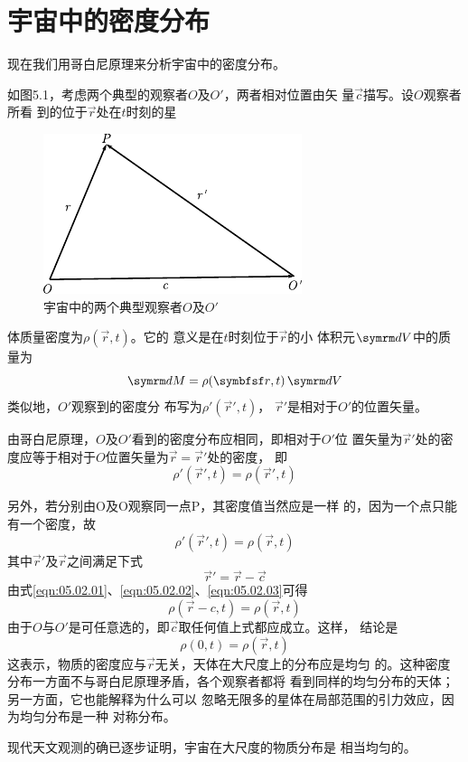 \section{宇宙中的密度分布}\label{sec:05.02}

现在我们用哥白尼原理来分析宇宙中的密度分布。

如图5.1，考虑两个典型的观察者$ O $及$  O'   $，两者相对位置由矢
量$ \vec{c} $描写。设$ O $观察者所看
到的位于$ \vec{r} $处在$ t $时刻的星
\begin{figure}
    \centering
    \includegraphics{figure/fig05.01}
    \caption{宇宙中的两个典型观察者$ O $及$ O' $}
    \label{fig:05.01}
\end{figure}
体质量密度为$  \rho ( \vec{r} , t )   $。它的
意义是在$ t $时刻位于$ \vec{r} $的小
体积元$ \dif V $中的质量为
{\setlength\mathindent{2em}
\begin{equation*}
    \dif M = \rho ( \vec{r} , t ) \dif V
\end{equation*}}
类似地，$ O' $观察到的密度分
布写为$  \rho ' ( \vec{r} ' , t )   $， $ \vec{r} ' $是相对于$ O' $的位置矢量。

由哥白尼原理，$ O $及$ O' $看到的密度分布应相同，即相对于$ O' $位
置矢量为$ \vec{r} ' $处的密度应等于相对于$ O $位置矢量为$ \vec{r} = \vec{r} ' $处的密度，
即
\begin{equation}\label{eqn:05.02.01}
    \rho ' ( \vec{r} ' , t ) = \rho ( \vec{r} ' , t )
\end{equation}

另外，若分别由O及O观察同一点P，其密度值当然应是一样
的，因为一个点只能有一个密度，故
\begin{equation}\label{eqn:05.02.02}
    \rho ' ( \vec{r} ' , t ) = \rho ( \vec{r} , t )
\end{equation}
其中$ \vec{r} ' $及$ \vec{r} $之间满足下式
\begin{equation}\label{eqn:05.02.03}
    \vec{r} ' = \vec{r} - \vec{c}
\end{equation}
由式\eqref{eqn:05.02.01}、\eqref{eqn:05.02.02}、\eqref{eqn:05.02.03}可得
\begin{equation}\label{eqn:05.02.04}
    \rho ( \vec{r} - c , t ) = \rho ( \vec{r} , t )
\end{equation}
由于$ O $与$ O' $是可任意选的，即$ \vec{c} $取任何值上式都应成立。这样，
结论是\vspace{-1.2em}
\begin{equation}\label{eqn:05.02.05}
    \rho ( 0 , t ) = \rho ( \vec{r} , t )
\end{equation}
这表示，物质的密度应与$ \vec{r} $无关，天体在大尺度上的分布应是均匀
的。这种密度分布一方面不与哥白尼原理矛盾，各个观察者都将
看到同样的均匀分布的天体；另一方面，它也能解释为什么可以
忽略无限多的星体在局部范围的引力效应，因为均匀分布是一种
对称分布。

现代天文观测的确已逐步证明，宇宙在大尺度的物质分布是
相当均匀的。
